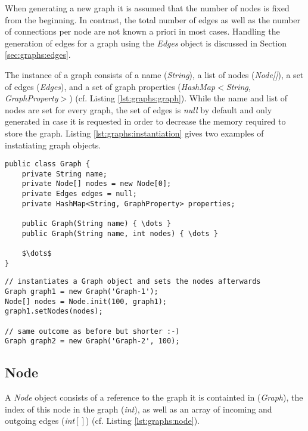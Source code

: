 When generating a new graph it is assumed that the number of nodes is fixed from the beginning.
In contrast, the total number of edges as well as the number of connections per node are not known a priori in most cases.
Handling the generation of edges for a graph using the \emph{Edges} object is discussed in Section \ref{sec:graphs:edges}.

The instance of a graph consists of a name (\emph{String}), a list of nodes (\emph{Node[]}), a set of edges (\emph{Edges}), and a set of graph properties (\emph{HashMap$<$String, GraphProperty$>$}) (cf. Listing \ref{lst:graphs:graph}).
While the name and list of nodes are set for every graph, the set of edges is \emph{null} by default and only generated in case it is requested in order to decrease the memory required to store the graph.
Listing \ref{lst:graphs:instantiation} gives two examples of instatiating graph objects.

\begin{lstlisting}[label={lst:graphs:graph},caption={Instance variables and constructors of the \emph{Graph} object}]
public class Graph {
	private String name;
	private Node[] nodes = new Node[0];
	private Edges edges = null;
	private HashMap<String, GraphProperty> properties;
	
	public Graph(String name) { \dots }
	public Graph(String name, int nodes) { \dots }
	
	$\dots$
}
\end{lstlisting}




\begin{lstlisting}[label={lst:graphs:instantiation}, caption={Examples for the usage of both \emph{Graph} constructors}]
// instantiates a Graph object and sets the nodes afterwards
Graph graph1 = new Graph('Graph-1');
Node[] nodes = Node.init(100, graph1);
graph1.setNodes(nodes);

// same outcome as before but shorter :-)
Graph graph2 = new Graph('Graph-2', 100);
\end{lstlisting}







\subsection{Node}
\label{sec:graphs:node}

A \emph{Node} object consists of a reference to the graph it is containted in (\emph{Graph}), the index of this node in the graph (\emph{int}), as well as an array of incoming and outgoing edges (\emph{int$[]$}) (cf. Listing \ref{lst:graphs:node}).

